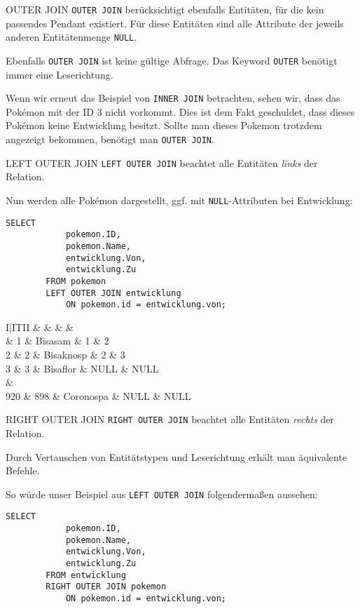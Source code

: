 \begin{defi}{OUTER JOIN}
    \texttt{OUTER JOIN} berücksichtigt ebenfalls Entitäten, für die kein passendes Pendant existiert.
    Für diese Entitäten sind alle Attribute der jeweils anderen Entitätenmenge \texttt{NULL}.

    Ebenfalls \texttt{OUTER JOIN} ist keine gültige Abfrage.
    Das Keyword \texttt{OUTER} benötigt immer eine Leserichtung.

    Wenn wir erneut das Beispiel von \texttt{INNER JOIN} betrachten, sehen wir, dass das Pokémon mit der ID 3 nicht vorkommt.
    Dies ist dem Fakt geschuldet, dass dieses Pokémon keine Entwicklung besitzt.
    Sollte man dieses Pokemon trotzdem angezeigt bekommen, benötigt man \texttt{OUTER JOIN}.
\end{defi}

\begin{sql}{LEFT OUTER JOIN}
    \texttt{LEFT OUTER JOIN} beachtet alle Entitäten \emph{links} der Relation.

    Nun werden alle Pokémon dargestellt, ggf. mit \texttt{NULL}-Attributen bei Entwicklung:

    \begin{lstlisting}[language=mysql]
        SELECT
            pokemon.ID,
            pokemon.Name,
            entwicklung.Von,
            entwicklung.Zu
        FROM pokemon
        LEFT OUTER JOIN entwicklung
            ON pokemon.id = entwicklung.von;
    \end{lstlisting}

    \setcounter{rownum}{0}
    \begin{tabular}{I|ITII}
        &  &  &  &  \\ & 1 & Bisasam & 1 & 2 \\
        2 & 2 & Bisaknosp & 2 & 3 \\
        3 & 3 & Bisaflor & NULL & NULL \\
         &  \\
        920 & 898 & Coronospa & NULL & NULL \\
    \end{tabular}
\end{sql}

\begin{sql}{RIGHT OUTER JOIN}
    \texttt{RIGHT OUTER JOIN} beachtet alle Entitäten \emph{rechts} der Relation.

    Durch Vertauschen von Entitätstypen und Leserichtung erhält man äquivalente Befehle.

    So würde unser Beispiel aus \texttt{LEFT OUTER JOIN} folgendermaßen aussehen:

    \begin{lstlisting}[language=mysql]
        SELECT
            pokemon.ID,
            pokemon.Name,
            entwicklung.Von,
            entwicklung.Zu
        FROM entwicklung
        RIGHT OUTER JOIN pokemon
            ON pokemon.id = entwicklung.von;
    \end{lstlisting}
\end{sql}

